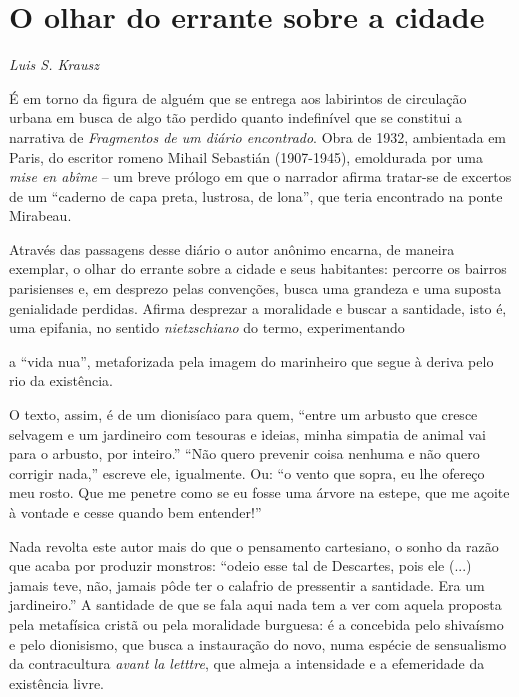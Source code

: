 \chapter*{O olhar do errante sobre a cidade}

\hfill\emph{Luis S. Krausz}

\bigskip

É em torno da figura de alguém que se entrega aos labirintos de
circulação urbana em busca de algo tão perdido quanto indefinível que se
constitui a narrativa de \emph{Fragmentos de um diário encontrado}. Obra
de 1932, ambientada em Paris, do escritor romeno Mihail Sebastián
(1907-1945), emoldurada por uma \emph{mise en abîme} -- um breve prólogo
em que o narrador afirma tratar-se de excertos de um ``caderno de capa
preta, lustrosa, de lona'', que teria encontrado na ponte Mirabeau.


Através das passagens desse diário o
autor anônimo encarna, de maneira exemplar, o olhar do errante sobre a
cidade e seus habitantes: percorre os bairros parisienses e, em desprezo
pelas convenções, busca uma grandeza e uma suposta genialidade perdidas.
Afirma desprezar a moralidade e buscar a santidade, isto é,
uma epifania, no sentido \emph{nietzschiano} do termo, experimentando \linebreak

\noindent{}a ``vida nua'', metaforizada pela imagem do marinheiro que segue à deriva
pelo rio da existência.

O texto, assim, é de um dionisíaco para quem, ``entre um arbusto que
cresce selvagem e um jardineiro com tesouras e ideias, minha simpatia de
animal vai para o arbusto, por inteiro.'' ``Não quero prevenir coisa
nenhuma e não quero corrigir nada,'' escreve ele, igualmente. Ou: ``o
vento que sopra, eu lhe ofereço meu rosto. Que me penetre como se eu
fosse uma árvore na estepe, que me açoite à vontade e cesse quando bem
entender!''

Nada revolta este autor mais do que o pensamento cartesiano, o sonho da
razão que acaba por produzir monstros: ``odeio esse tal de Descartes,
pois ele (...) jamais teve, não, jamais pôde ter o calafrio de
pressentir a santidade. Era um jardineiro.'' A santidade de que se fala
aqui nada tem a ver com aquela proposta pela metafísica cristã ou pela
moralidade burguesa: é a concebida pelo shivaísmo e pelo dionisismo, que
busca a instauração do novo, numa espécie de sensualismo da
contracultura \emph{avant la letttre}, que almeja a intensidade e a
efemeridade da existência livre.

